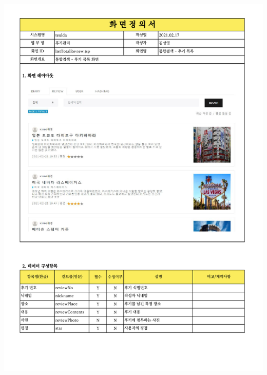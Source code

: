 {{{{{{{{{{{{{{{{{{{{{{{{{{{{{{{{{{{{{{{{{{{{{{{{{{{{{{{{{{{{{{{{{{{{{{{{{{{{{{{{\includegraphics[width=20cm]{./Figure/Design/Display/totalSearch/totalSearch_03.pdf} \\
}}}}}}}}}}}}}}}}}}}}}}}}}}}}}}}}}}}}}}}}}}}}}}}}}}}}}}}}}}}}}}}}}}}}}}}}}}}}}}}}
